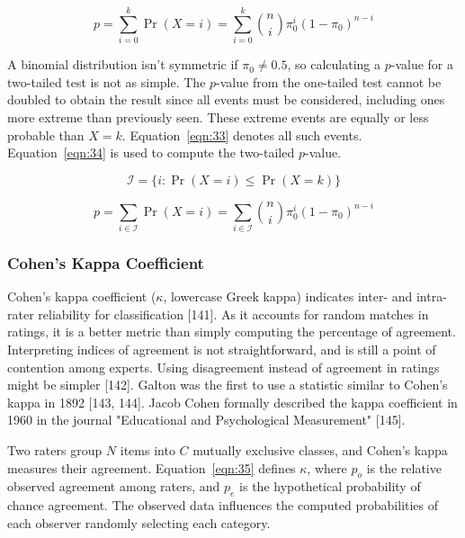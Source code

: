 \documentclass[preprint,12pt]{elsarticle}
\begin{document}
\begin{equation}
	p=\sum_{i=0}^{k}\Pr(X=i)=\sum_{i=0}^{k}{\binom{n}{i}}\pi_{0}^{i}(1-\pi_{0})^{n-i}
	\label{eqn:32}
\end{equation}

A binomial distribution isn't symmetric if $\pi_{0}\neq 0.5$, so calculating a $p$-value for a two-tailed test is not as simple. The $p$-value from the one-tailed test cannot be doubled to obtain the result since all events must be considered, including ones more extreme than previously seen. These extreme events are equally or less probable than $X=k$. Equation~\ref{eqn:33} denotes all such events. Equation~\ref{eqn:34} is used to compute the two-tailed $p$-value.

\begin{equation}
	{\mathcal{I}}=\{i\colon \Pr(X=i)\leq \Pr(X=k)\}
	\label{eqn:33}
\end{equation}

\begin{equation}
	p=\sum_{i\in {\mathcal{I}}}\Pr(X=i)=\sum_{i\in {\mathcal{I}}}{\binom{n}{i}}\pi_{0}^{i}(1-\pi_{0})^{n-i}
	\label{eqn:34}
\end{equation}

\subsubsection{Cohen's Kappa Coefficient}

Cohen's kappa coefficient ($\kappa$, lowercase Greek kappa) indicates inter- and intra-rater reliability for classification [141]. As it accounts for random matches in ratings, it is a better metric than simply computing the percentage of agreement. Interpreting indices of agreement is not straightforward, and is still a point of contention among experts. Using disagreement instead of agreement in ratings might be simpler [142]. Galton was the first to use a statistic similar to Cohen's kappa in 1892 [143, 144]. Jacob Cohen formally described the kappa coefficient in 1960 in the journal "Educational and Psychological Measurement" [145].

Two raters group $N$ items into $C$ mutually exclusive classes, and Cohen's kappa measures their agreement. Equation~\ref{eqn:35} defines $\kappa$, where $p_{o}$ is the relative observed agreement among raters, and $p_{e}$ is the hypothetical probability of chance agreement. The observed data influences the computed probabilities of each observer randomly selecting each category.
\end{document}
